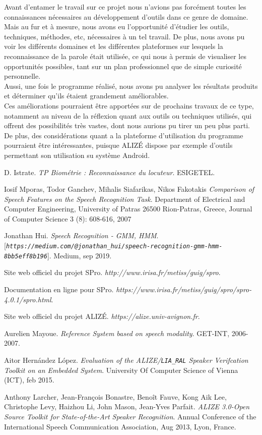 \documentclass[a4paper, 12pt]{book}
\newcounter{program}[subsection]
\begin{document}
Avant d'entamer le travail sur ce projet nous n'avions pas forcément toutes les connaissances nécessaires au développement d'outils dans ce genre de domaine.
Mais au fur et à mesure, nous avons eu l'opportunité d'étudier les outils, techniques, méthodes, etc, nécessaires à un tel travail.
De plus, nous avons pu voir les différents domaines et les différentes plateformes sur lesquels la reconnaissance de la parole était utilisée, ce qui nous à permis de visualiser les opportunités possibles, tant sur un plan professionnel que de simple curiosité personnelle.\\

Aussi, une fois le programme réalisé, nous avons pu analyser les résultats produits et déterminer qu'ils étaient grandement améliorables.\\

Ces améliorations pourraient être apportées sur de prochains travaux de ce type, notamment au niveau de la réflexion quant aux outils ou techniques utilisés, qui offrent des possibilités très vastes, dont nous aurions pu tirer un peu plus parti. De plus, des considérations quant a la plateforme d'utilisation du programme pourraient être intéressantes, puisque ALIZÉ dispose par exemple d'outils permettant son utilisation su système Android.

\begin{thebibliography}{9}
D. Istrate.
\textit{TP Biométrie : Reconnaissance du locuteur}. 
ESIGETEL.

Iosif Mporas, Todor Ganchev, Mihalis Siafarikas, Nikos Fakotakis
\textit{Comparison of Speech Features on the Speech Recognition Task}. 
Department of Electrical and Computer Engineering, University of Patras 26500 Rion-Patras, Greece, Journal of Computer Science 3 (8): 608-616, 2007

Jonathan Hui.
\textit{Speech Recognition - GMM, HMM}.
[\textit{\texttt{https://medium.com/@jonathan\_hui/speech-recognition-gmm-hmm-8bb5eff8b196}}].
Medium, sep 2019.

Site web officiel du projet SPro.
\textit{http://www.irisa.fr/metiss/guig/spro}.

Documentation en ligne pour SPro.
\textit{https://www.irisa.fr/metiss/guig/spro/spro-4.0.1/spro.html}.

Site web officiel du projet ALIZÉ.
\textit{https://alize.univ-avignon.fr}.

Aurelien Mayoue. 
\textit{Reference System based on speech modality}. 
GET-INT, 2006-2007.

Aitor Hernández López. 
\textit{Evaluation of the ALIZE/\texttt{LIA\_RAL} Speaker Verifcation Toolkit on an Embedded System}. 
University Of Computer Science of Vienna (ICT), feb 2015.

Anthony Larcher, Jean-François Bonastre, Benoît Fauve, Kong Aik Lee, Christophe Levy, Haizhou Li, John Mason, Jean-Yves Parfait.
\textit{ALIZE 3.0-Open Source Toolkit for State-of-the-Art Speaker Recognition}. 
Annual Conference of the International Speech Communication Association, Aug 2013, Lyon, France.
\end{thebibliography}

%
%
\end{document}
